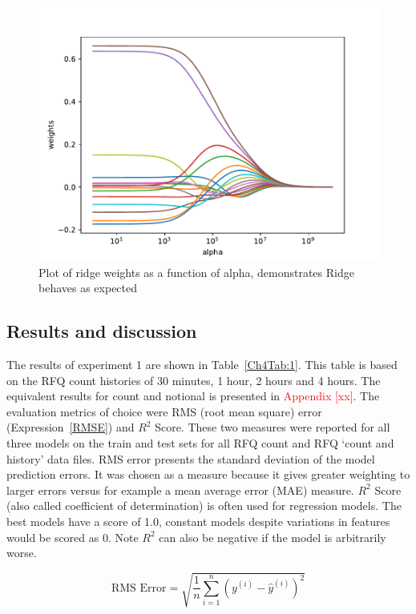 \begin{figure}[!ht]\centering
    \includegraphics[width=0.8\linewidth]{./figures/ch4weights_ridge}
    \caption{Plot of ridge weights as a function of alpha, demonstrates Ridge behaves as expected}\label{Ch4Fig:weights_ridge}
\end{figure}




\subsection{Results and discussion}

The results of experiment 1 are shown in Table~\ref{Ch4Tab:1}. This table is based on the RFQ count histories of 30 minutes, 1 hour, 2 hours and 4 hours. The equivalent results for count and notional is presented in \textcolor{red}{Appendix [xx]}. 
The evaluation metrics of choice were RMS (root mean square) error (Expression~\ref{RMSE}) and $R^2$ Score. These two measures were reported for all three models on the train and test sets for all RFQ count and RFQ `count and history' data files. RMS error presents the standard deviation of the model prediction errors. It was chosen as a measure because it gives greater weighting to larger errors versus for example a mean average error (MAE) measure. $R^2$ Score (also called coefficient of determination) is often used for regression models. The best models have a score of 1.0, constant models despite variations in features would be scored as 0. Note $R^2$ can also be negative if the model is arbitrarily worse.

\begin{equation}\label{RMSE}
    \text{RMS Error} = \sqrt{\dfrac{1}{n} \sum_{i=1}^{n} {\left( {y}^{(i)} - {\hat{y}}^{(i)} \right)}^{2}}
\end{equation}


